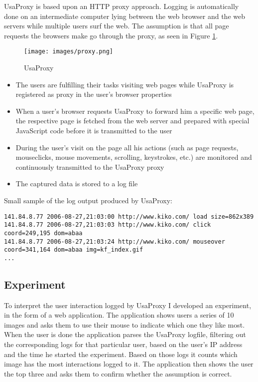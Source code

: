 UsaProxy \cite{wnuk2005usability}\cite{atterer2006logging}\cite{atterer2007tracking} is based upon an HTTP proxy approach. Logging is automatically done on an intermediate computer lying between the web browser and the web servers while multiple users surf the web. The assumption is that all page requests the browsers make go through the proxy, as seen in Figure \ref{fig:proxy}.
	
\begin{figure}[h] 
	\centering
	\texttt{[image: images/proxy.png]}
	\caption{UsaProxy}
	\label{fig:proxy}
\end{figure}
	
\begin{itemize}	
	\item The users are fulfilling their tasks visiting web pages while UsaProxy is registered as proxy in the user's browser properties
	\item When a user's browser requests UsaProxy to forward him a specific web page, the respective page is fetched from the web server and prepared with special JavaScript code before it is transmitted to the user
	\item During the user’s visit on the page all his actions (such as page requests, mouseclicks, mouse movements, scrolling, keystrokes, etc.) are monitored and continuously transmitted to the UsaProxy proxy
	\item The captured data is stored to a log file
\end{itemize}
\newpage
Small sample of the log output produced by UsaProxy:

\begin{lstlisting}
141.84.8.77 2006-08-27,21:03:00 http://www.kiko.com/ load size=862x389
141.84.8.77 2006-08-27,21:03:03 http://www.kiko.com/ click coord=249,195 dom=abaa
141.84.8.77 2006-08-27,21:03:24 http://www.kiko.com/ mouseover coord=341,164 dom=abaa img=kf_index.gif
...
\end{lstlisting}
	
\subsection{Experiment}
To interpret the user interaction logged by UsaProxy I developed an experiment, in the form of a web application. The application shows users a series of 10 images and asks them to use their mouse to indicate which one they like most. When the user is done the application parses the UsaProxy logfile, filtering out the corresponding logs for that particular user, based on the user's IP address and the time he started the experiment. Based on those logs it counts which image has the most interactions logged to it. The application then shows the user the top three and asks them to confirm whether the assumption is correct.